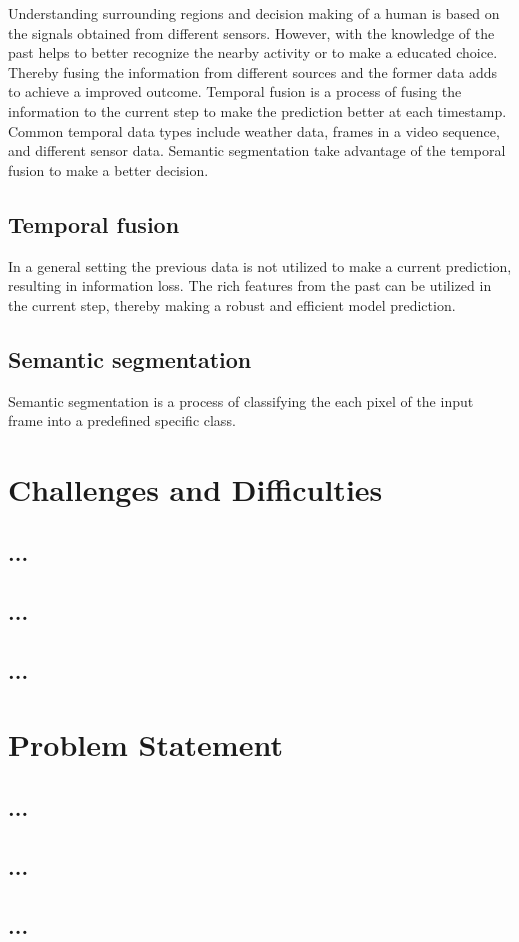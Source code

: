     Understanding surrounding regions and decision making of a human is based on the signals obtained from different sensors. However, with the knowledge of the past helps to better recognize the nearby activity or to make a educated choice. Thereby fusing the information from different sources and the former data adds to achieve a improved outcome. Temporal fusion is a process of fusing the information to the current step to make the prediction better at each timestamp. Common temporal data types include weather data, frames in a video sequence, and different sensor data. Semantic segmentation take advantage of the temporal fusion to make a better decision. 
    
    \subsection{Temporal fusion}

    In a general setting the previous data is not utilized to make a current prediction, resulting in information loss. The rich features from the past can be utilized in the current step, thereby making a robust and efficient model prediction. 

    \subsection{Semantic segmentation}
	
	Semantic segmentation is a process of classifying the each pixel of the input frame into a predefined specific class.  

    \section{Challenges and Difficulties}
    \subsection{...}

    \lipsum[11-15]

    \subsection{...}

    \subsection{...}



    \section{Problem Statement}
    \subsection{...}

    \lipsum[21-30]

    \subsection{...}


    \subsection{...}
